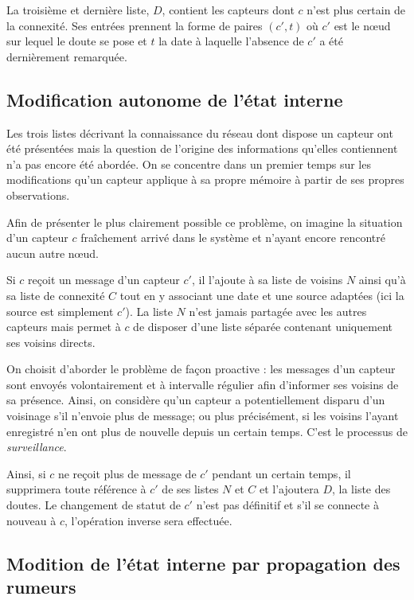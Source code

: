 \documentclass[10pt]{article}
\begin{document}
\begin{multicols}{2}
La troisième et dernière liste, $D$, contient les capteurs dont $c$
n'est plus certain de la connexité. Ses entrées prennent la forme de
paires $(c',t)$ o\`u $c'$ est le n\oe ud sur lequel le doute se pose
et $t$ la date à laquelle l'absence de $c'$ a été dernièrement
remarquée.

\subsection*{Modification autonome de l'état interne}

Les trois listes décrivant la connaissance du réseau dont dispose un
capteur ont été présentées mais la question de l'origine des
informations qu'elles contiennent n'a pas encore été abordée. On se
concentre dans un premier temps sur les modifications qu'un capteur
applique à sa propre mémoire à partir de ses propres observations.

Afin de présenter le plus clairement possible ce problème, on imagine
la situation d'un capteur $c$ fraîchement arrivé dans le système et
n'ayant encore rencontré aucun autre n\oe ud.

Si $c$ reçoit un message d'un capteur $c'$, il l'ajoute à sa liste de
voisins $N$ ainsi qu'à sa liste de connexité $C$ tout en y associant
une date et une source adaptées (ici la source est simplement
$c'$). La liste $N$ n'est jamais partagée avec les autres capteurs
mais permet à $c$ de disposer d'une liste séparée contenant uniquement
ses voisins directs.

On choisit d'aborder le problème de façon proactive : les messages
d'un capteur sont envoyés volontairement et à intervalle régulier afin
d'informer ses voisins de sa présence. Ainsi, on considère qu'un
capteur a potentiellement disparu d'un voisinage s'il n'envoie plus de
message; ou plus précisément, si les voisins l'ayant enregistré n'en
ont plus de nouvelle depuis un certain temps. C'est le processus de
\textit{surveillance}.

Ainsi, si $c$ ne reçoit plus de message de $c'$ pendant un certain
temps, il supprimera toute référence à $c'$ de ses listes $N$ et $C$
et l'ajoutera $D$, la liste des doutes. Le changement de statut de
$c'$ n'est pas définitif et s'il se connecte à nouveau à $c$,
l'opération inverse sera effectuée.

\subsection*{Modition de l'état interne par propagation des rumeurs}


\end{multicols}
\end{document}
